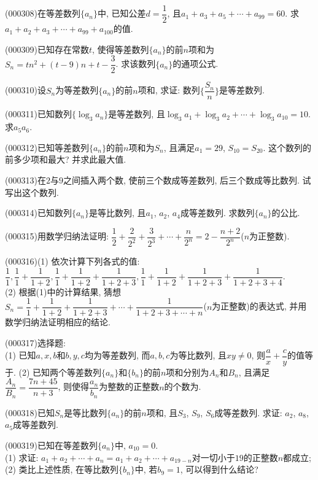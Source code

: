 \item (000308)在等差数列$\{a_n\}$中, 已知公差$d=\dfrac12$, 且$a_1+a_3+a_5+\cdots+a_{99}=60$. 求$a_1+a_2+a_3+\cdots+a_{99}+a_{100}$的值.
\item (000309)已知存在常数$t$, 使得等差数列$\{a_n\}$的前$n$项和为$S_n=tn^2+(t-9)n+t-\dfrac 32$. 求该数列$\{a_n\}$的通项公式.
\item (000310)设$S_n$为等差数列$\{a_n\}$的前$n$项和, 求证: 数列$\{\dfrac{S_n}n\}$是等差数列.
\item (000311)已知数列$\{\log_3a_n\}$是等差数列, 且$\log_3a_1+\log_3a_2+\cdots+\log_3a_{10}=10$. 求$a_5a_6$.
\item (000312)已知等差数列$\{a_n\}$的前$n$项和为$S_n$, 且满足$a_1=29$, $S_{10}=S_{20}$. 这个数列的前多少项和最大? 并求此最大值.
\item (000313)在$2$与$9$之间插入两个数, 使前三个数成等差数列, 后三个数成等比数列. 试写出这个数列.
\item (000314)已知数列$\{a_n\}$是等比数列, 且$a_1$, $a_2$, $a_4$成等差数列. 求数列$\{a_n\}$的公比.
\item (000315)用数学归纳法证明: $\dfrac12+\dfrac2{2^2}+\dfrac3{2^3}+\cdots+\dfrac n{2^n}=2-\dfrac{n+2}{2^n}$($n$为正整数).
\item (000316)(1) 依次计算下列各式的值: $\dfrac11,\dfrac11+\dfrac1{1+2},\dfrac11+\dfrac1{1+2}+\dfrac1{1+2+3},\dfrac11+\dfrac1{1+2}+\dfrac1{1+2+3}+\dfrac1{1+2+3+4}$.\\
(2) 根据(1)中的计算结果, 猜想$S_n=\dfrac11+\dfrac1{1+2}+\dfrac1{1+2+3}+\cdots+\dfrac1{1+2+3+\cdots+n}$($n$为正整数)的表达式, 并用数学归纳法证明相应的结论.
\item (000317)选择题:\\
(1) 已知$a, x, b$和$b, y, c$均为等差数列, 而$a, b, c$为等比数列, 且$xy\ne 0$, 则$\dfrac{a}{x}+\dfrac{c}{y}$的值等于.
(2) 已知两个等差数列$\{a_n\}$和$\{b_n\}$的前$n$项和分别为$A_n$和$B_n$, 且满足$\dfrac{A_n}{B_n}=\dfrac{7n+45}{n+3}$, 则使得$\dfrac{a_n}{b_n}$为整数的正整数$n$的个数为.
\item (000318)已知$S_n$是等比数列$\{a_n\}$的前$n$项和, 且$S_3$, $S_9$, $S_6$成等差数列. 求证: $a_2$, $a_8$, $a_5$成等差数列.
\item (000319)已知在等差数列$\{a_n\}$中, $a_{10}=0$.\\
(1) 求证: $a_1+a_2+\cdots+a_n=a_1+a_2+\cdots+a_{19-n}$对一切小于$19$的正整数$n$都成立;\\
(2) 类比上述性质, 在等比数列$\{b_n\}$中, 若$b_9=1$, 可以得到什么结论?
